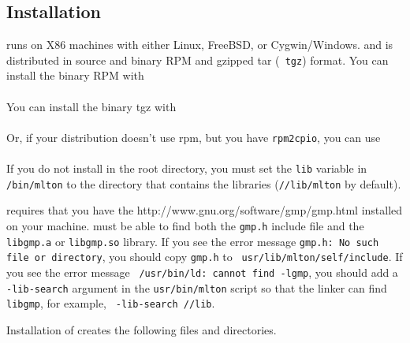 
\subsection{Installation}

{\mlton} runs on X86 machines with either Linux, FreeBSD, or Cygwin/Windows.
and is distributed in source and binary RPM and gzipped tar ({\tt
tgz}) format.  You can install the binary RPM with\\
\hspace*{2em}{\tt rpm -i mlton-\version-1.i386.rpm}\\
You can install the binary tgz with\\
\hspace*{2em}{\tt zcat mlton-\version-1.i386-linux.tgz | tar x}\\
Or, if your distribution doesn't use rpm, but you have {\tt rpm2cpio},
you can use\\
\hspace*{2em}{\tt rpm2cpio mlton-\version-1.i386.rpm | cpio -id}\\
If you do not install {\mlton} in the root directory, you must
set the {\tt lib} variable in {\tt \prefix/bin/mlton} to the
directory that contains the libraries ({\tt /\prefix/lib/mlton} by
default).

{\mlton} requires that you have the
		  {http://www.gnu.org/software/gmp/gmp.html}
installed on your machine.  {\mlton} must be able to find both the
{\tt gmp.h} include file and the {\tt libgmp.a} or {\tt libgmp.so}
library. If you see the error message {\tt gmp.h: No such file or
directory}, you should copy {\tt gmp.h} to {\tt
usr/lib/mlton/self/include}.  If you see the error message {\tt
/usr/bin/ld: cannot find -lgmp}, you 
should add a {\tt -lib-search} argument in the {\tt usr/bin/mlton}
script so that the linker can find {\tt libgmp}, for example, {\tt
-lib-search /\prefix/lib}.

Installation of {\mlton} creates the following files and directories.

\newcommand{\place}[1]{\item[\tt #1]\hspace{1in}\\}


